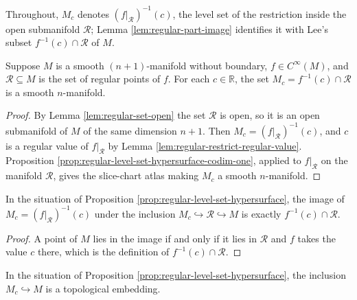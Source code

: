 Throughout, $M_c$ denotes $(f|_{\mathcal{R}})^{-1}(c)$, the level set of the restriction inside the open submanifold $\mathcal{R}$; Lemma \ref{lem:regular-part-image} identifies it with Lee's subset $f^{-1}(c) \cap \mathcal{R}$ of $M$.

\begin{proposition}
\label{prop:regular-level-set-hypersurface}
\leanok
{}
Suppose $M$ is a smooth $(n+1)$-manifold without boundary, $f \in C^\infty(M)$, and
$\mathcal{R} \subseteq M$ is the set of regular points of $f$. For each $c \in \mathbb{R}$, the set $M_c = f^{-1}(c) \cap \mathcal{R}$ is a smooth $n$-manifold.
\end{proposition}

\begin{proof}
\leanok
{}
By Lemma \ref{lem:regular-set-open} the set $\mathcal{R}$ is open, so it is an open submanifold of $M$ of the same dimension $n+1$. Then $M_c = (f|_{\mathcal{R}})^{-1}(c)$, and $c$ is a regular value of $f|_{\mathcal{R}}$ by Lemma \ref{lem:regular-restrict-regular-value}. Proposition \ref{prop:regular-level-set-hypersurface-codim-one}, applied to $f|_{\mathcal{R}}$ on the manifold $\mathcal{R}$, gives the slice-chart atlas making $M_c$ a smooth $n$-manifold.
\end{proof}

\begin{lemma}
\label{lem:regular-part-image}
\leanok
{}
In the situation of Proposition \ref{prop:regular-level-set-hypersurface}, the image of $M_c = (f|_{\mathcal{R}})^{-1}(c)$ under the inclusion $M_c \hookrightarrow \mathcal{R} \hookrightarrow M$ is exactly $f^{-1}(c) \cap \mathcal{R}$.
\end{lemma}

\begin{proof}
\leanok
A point of $M$ lies in the image if and only if it lies in $\mathcal{R}$ and $f$ takes the value $c$ there, which is the definition of $f^{-1}(c) \cap \mathcal{R}$.
\end{proof}

\begin{lemma}
\label{lem:regular-part-embedded}
\leanok
{}
In the situation of Proposition \ref{prop:regular-level-set-hypersurface}, the inclusion $M_c \hookrightarrow M$ is a topological embedding.
\end{lemma}


